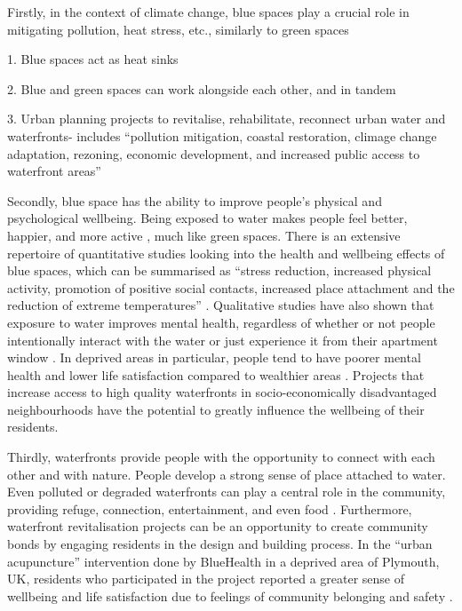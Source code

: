 \documentclass{article}
\begin{document}
Firstly, in the context of climate change, blue spaces play a crucial role in mitigating pollution, heat stress, etc., similarly to green spaces

	1. Blue spaces act as heat sinks \parencite{lin2020water}

	2. Blue and green spaces can work alongside each other, and in tandem

	3. Urban planning projects to revitalise, rehabilitate, reconnect urban water and waterfronts- includes  ``pollution mitigation, coastal restoration, climage change adaptation, rezoning, economic development, and increased public access to waterfront areas'' \parencite{toomey2021place}

Secondly, blue space has the ability to improve people's physical and psychological wellbeing. Being exposed to water makes people feel better, happier, and more active \parencite{gascon2017outdoor}, much like green spaces. 
There is an extensive repertoire of quantitative studies looking into the health and wellbeing effects of blue spaces, which can be summarised as ``stress reduction, increased physical activity, promotion of positive social contacts, increased place attachment and the reduction of extreme temperatures'' \parencite{gascon2017outdoor}. Qualitative studies have also shown that exposure to water improves mental health, regardless of whether or not people intentionally interact with the water or just experience it from their apartment window \parencite{garrett2019urban}.
In deprived areas in particular, people tend to have poorer mental health and lower life satisfaction compared to wealthier areas \parencite{van2021urban}. Projects that increase access to high quality waterfronts in socio-economically disadvantaged neighbourhoods have the potential to greatly influence the wellbeing of their residents.

Thirdly, waterfronts provide people with the opportunity to connect with each other and with nature. People develop a strong sense of place attached to water. Even polluted or degraded waterfronts can play a central role in the community, providing refuge, connection, entertainment, and even food \parencite{toomey2021place}. 
Furthermore, waterfront revitalisation projects can be an opportunity to create community bonds by engaging residents in the design and building process. In the ``urban acupuncture'' intervention done by BlueHealth in a deprived area of Plymouth, UK, residents who participated in the project reported a greater sense of wellbeing and life satisfaction due to feelings of community belonging and safety \parencite{van2021urban}.
\end{document}
